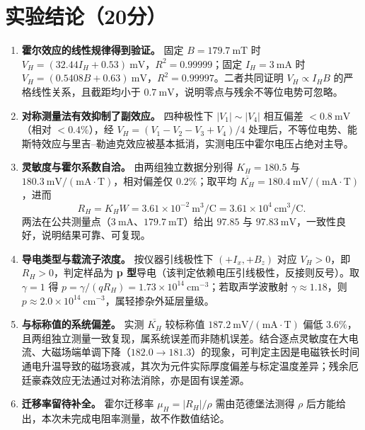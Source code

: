 \documentclass[12pt,a4paper]{ctexart}
\begin{document}
\section*{实验结论（20分）}
\begin{enumerate}
    \item \textbf{霍尔效应的线性规律得到验证。} 固定 $B=179.7\ \mathrm{mT}$ 时 $V_H=(32.44I_H+0.53)\ \mathrm{mV}$，$R^2=0.99999$；固定 $I_H=3\ \mathrm{mA}$ 时 $V_H=(0.5408B+0.63)\ \mathrm{mV}$，$R^2=0.99997$。二者共同证明 $V_H\propto I_HB$ 的严格线性关系，且截距均小于 $0.7\ \mathrm{mV}$，说明零点与残余不等位电势可忽略。

    \item \textbf{对称测量法有效抑制了副效应。} 四种极性下 $|V_1|\!\sim\!|V_4|$ 相互偏差 $<0.8\ \mathrm{mV}$（相对 $<0.4\%$），经 $V_H=(V_1-V_2-V_3+V_4)/4$ 处理后，不等位电势、能斯特效应与里吉--勒迪克效应被基本抵消，实测电压中霍尔电压占绝对主导。

    \item \textbf{灵敏度与霍尔系数自洽。} 由两组独立数据分别得 $K_H=180.5$ 与 $180.3\ \mathrm{mV/(mA\cdot T)}$，相对偏差仅 $0.2\%$；取平均 $\overline{K_H}=180.4\ \mathrm{mV/(mA\cdot T)}$，进而
    \[R_H=K_HW=3.61\times10^{-2}\ \mathrm{m^3/C}=3.61\times10^{4}\ \mathrm{cm^3/C}.\]
    两法在公共测量点（$3\ \mathrm{mA}$、$179.7\ \mathrm{mT}$）给出 $97.85$ 与 $97.83\ \mathrm{mV}$，一致性良好，说明结果可靠、可复现。

    \item \textbf{导电类型与载流子浓度。} 按仪器引线极性下 $(+I_x,+B_z)$ 对应 $V_H>0$，即 $R_H>0$，判定样品为 \textbf{p 型}导电（该判定依赖电压引线极性，反接则反号）。取 $\gamma=1$ 得 $p=\gamma/(qR_H)=1.73\times10^{14}\ \mathrm{cm^{-3}}$；若取声学波散射 $\gamma\approx1.18$，则 $p\approx2.0\times10^{14}\ \mathrm{cm^{-3}}$，属轻掺杂外延层量级。

    \item \textbf{与标称值的系统偏差。} 实测 $\overline{K_H}$ 较标称值 $187.2\ \mathrm{mV/(mA\cdot T)}$ 偏低 $3.6\%$，且两组独立测量一致复现，属系统误差而非随机误差。结合逐点灵敏度在大电流、大磁场端单调下降（$182.0\!\to\!181.3$）的现象，可判定主因是电磁铁长时间通电升温导致的磁场衰减，其次为元件实际厚度偏差与标定温度差异；残余厄廷豪森效应无法通过对称法消除，亦是固有误差源。

    \item \textbf{迁移率留待补全。} 霍尔迁移率 $\mu_H=|R_H|/\rho$ 需由范德堡法测得 $\rho$ 后方能给出，本次未完成电阻率测量，故不作数值结论。
\end{enumerate}
\end{document}
